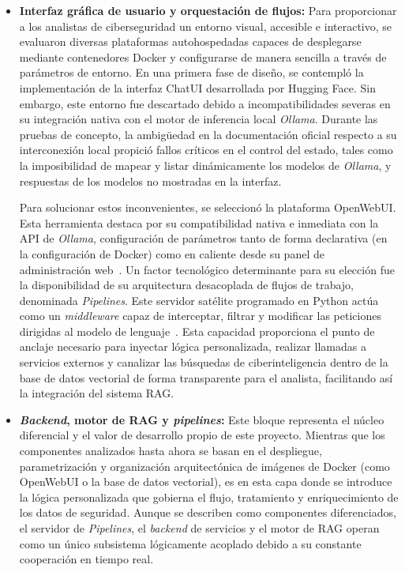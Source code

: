 \documentclass[12pt]{report}
\newcommand{\pipelines}{\textit{Pipelines}}
\begin{document}
\begin{itemize}
    La elección de esta pareja de modelos permite someter la herramienta a una validación práctica frente a los benchmarks de referencia de la literatura científica~\cite{levi2025toward}.
    \item \textbf{Interfaz gráfica de usuario y orquestación de flujos:} Para proporcionar a los analistas de ciberseguridad un entorno visual, accesible e interactivo, se evaluaron diversas plataformas autohospedadas capaces de desplegarse mediante contenedores Docker y configurarse de manera sencilla a través de parámetros de entorno. En una primera fase de diseño, se contempló la implementación de la interfaz ChatUI desarrollada por Hugging Face. Sin embargo, este entorno fue descartado debido a incompatibilidades severas en su integración nativa con el motor de inferencia local \textit{Ollama}. Durante las pruebas de concepto, la ambigüedad en la documentación oficial respecto a su interconexión local propició fallos críticos en el control del estado, tales como la imposibilidad de mapear y listar dinámicamente los modelos de \textit{Ollama}, y respuestas de los modelos no mostradas en la interfaz.

    Para solucionar estos inconvenientes, se seleccionó la plataforma OpenWebUI. Esta herramienta destaca por su compatibilidad nativa e inmediata con la API de \textit{Ollama}, configuración de parámetros tanto de forma declarativa (en la configuración de Docker) como en caliente desde su panel de administración web~\cite{openwebui}. Un factor tecnológico determinante para su elección fue la disponibilidad de su arquitectura desacoplada de flujos de trabajo, denominada \pipelines. Este servidor satélite programado en Python actúa como un \textit{middleware} capaz de interceptar, filtrar y modificar las peticiones dirigidas al modelo de lenguaje~\cite{pipelines}. Esta capacidad proporciona el punto de anclaje necesario para inyectar lógica personalizada, realizar llamadas a servicios externos y canalizar las búsquedas de ciberinteligencia dentro de la base de datos vectorial de forma transparente para el analista, facilitando así la integración del sistema RAG.
    
    \item \textbf{\textit{Backend}, motor de RAG y \textit{pipelines}:} Este bloque representa el núcleo diferencial y el valor de desarrollo propio de este proyecto. Mientras que los componentes analizados hasta ahora se basan en el despliegue, parametrización y organización arquitectónica de imágenes de Docker (como OpenWebUI o la base de datos vectorial), es en esta capa donde se introduce la lógica personalizada que gobierna el flujo, tratamiento y enriquecimiento de los datos de seguridad. Aunque se describen como componentes diferenciados, el servidor de \pipelines, el \textit{backend} de servicios y el motor de RAG operan como un único subsistema lógicamente acoplado debido a su constante cooperación en tiempo real. 


\end{itemize}
\end{document}
